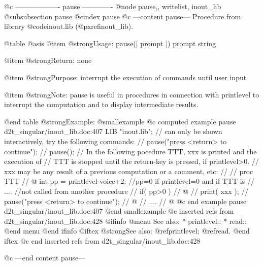 @c ------------------- pause -------------
@node pause,, writelist, inout_lib
@subsubsection pause
@cindex pause
@c ---content pause---
Procedure from library @code{inout.lib} (@pxref{inout_lib}).

@table @asis
@item @strong{Usage:}
pause([ prompt ]) prompt string

@item @strong{Return:}
none

@item @strong{Purpose:}
interrupt the execution of commands until user input

@item @strong{Note:}
pause is useful in procedures in connection with printlevel to
interrupt the computation and to display intermediate results.

@end table
@strong{Example:}
@smallexample
@c computed example pause d2t_singular/inout_lib.doc:407 
LIB "inout.lib";
// can only be shown interactively, try the following commands:
// pause("press <return> to continue");
// pause();
// In the following pocedure TTT, xxx is printed and the execution of
// TTT is stopped until the return-key is pressed, if printlevel>0.
// xxx may be any result of a previous computation or a comment, etc:
//
// proc TTT
// @{ int pp = printlevel-voice+2;  //pp=0 if printlevel=0 and if TTT is
//    ....                         //not called from another procedure
//    if( pp>0 )
//    @{
//       print( xxx );
//       pause("press <return> to continue");
//    @}
//     ....
// @}
@c end example pause d2t_singular/inout_lib.doc:407
@end smallexample
@c inserted refs from d2t_singular/inout_lib.doc:428
@ifinfo
@menu
See also:
* printlevel::
* read::
@end menu
@end ifinfo
@iftex
@strong{See also:}
@ref{printlevel};
@ref{read}.
@end iftex
@c end inserted refs from d2t_singular/inout_lib.doc:428

@c ---end content pause---
